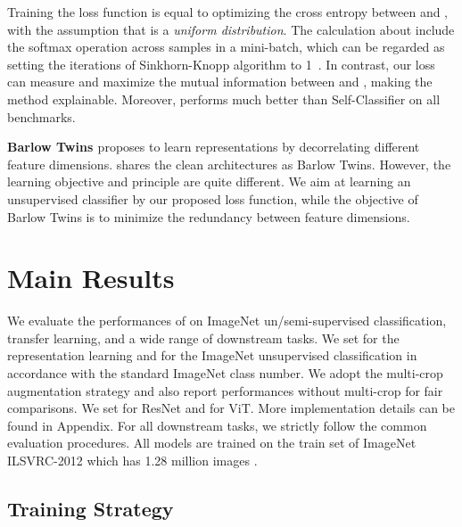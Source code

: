 \documentclass[10pt,twocolumn,letterpaper]{article}
\begin{document}
Training the loss function is equal to optimizing the cross entropy between  and , with the assumption that  is a \textit{uniform distribution}. The calculation about  include the softmax operation across samples in a mini-batch, which can be regarded as setting the iterations of Sinkhorn-Knopp algorithm to 1~\cite{caron2021emerging}. 
In contrast, our \ourmethod loss can measure and maximize the mutual information between  and , making the method explainable. Moreover, \ourmethod performs much better than Self-Classifier on all benchmarks.

\textbf{Barlow Twins \cite{zbontar2021barlow}} proposes to learn representations by decorrelating different feature dimensions. \ourmethod shares the clean architectures as Barlow Twins. However, the learning objective and principle are quite different. We aim at learning an unsupervised classifier by our proposed loss function, while the objective of Barlow Twins is to minimize the redundancy between feature dimensions.


\section{Main Results}
We evaluate the performances of \ourmethod on ImageNet un/semi-supervised classification, transfer learning, and a wide range of downstream tasks. We set  for the
representation learning
and  for the ImageNet unsupervised classification in accordance with the standard ImageNet class number. We adopt the multi-crop \cite{caron2020unsupervised} augmentation strategy and also report performances without multi-crop for fair comparisons. We set  for ResNet and  for ViT. More implementation details can be found in Appendix. For all downstream tasks, we strictly follow the common evaluation procedures. All \ourmethod models are trained on the train set of ImageNet ILSVRC-2012 which has 1.28 million images \cite{deng2009imagenet}. 

\subsection{Training Strategy}
\end{document}
